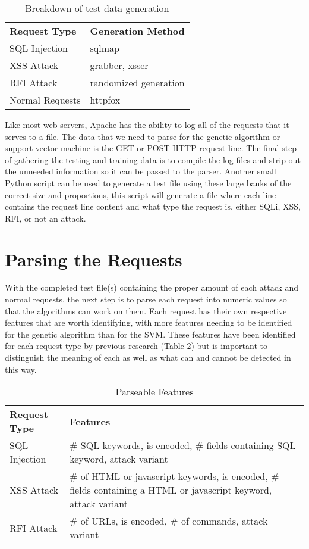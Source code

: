 \begin{table}
	\centering
	\label{tab:tools}
	\begin{tabular}{|l|l|}
	\hline
		\textbf{Request Type} & \textbf{Generation Method}\\
	\hhline{|=|=|}
		SQL Injection & sqlmap\\
	\hline
		XSS Attack & grabber, xsser\\
	\hline
		RFI Attack & randomized generation\\
	\hline
		Normal Requests & httpfox\\
	\hline
	\end{tabular}
	\caption{Breakdown of test data generation}
\end{table}

Like most web-servers, Apache has the ability to log all of the requests that it serves to a file.  The data that we need to parse for the genetic algorithm or support vector machine is the GET or POST HTTP request line.  The final step of gathering the testing and training data is to compile the log files and strip out the unneeded information so it can be passed to the parser.  Another small Python script can be used to generate a test file using these large banks of the correct size and proportions, this script will generate a file where each line contains the request line content and what type the request is, either SQLi, XSS, RFI, or not an attack.

\section{Parsing the Requests}

With the completed test file(s) containing the proper amount of each attack and normal requests, the next step is to parse each request into numeric values so that the algorithms can work on them.  Each request has their own respective features that are worth identifying, with more features needing to be identified for the genetic algorithm than for the SVM.  These features have been identified for each request type by previous research (Table \ref{tab:features}) but is important to distinguish the meaning of each as well as what can and cannot be detected in this way. %

\begin{table}
	\centering
	\label{tab:features}
	\begin{tabular}{|p{1.5in}|p{4.5in}|}
	\hline
		\textbf{Request Type} & \textbf{Features}\\
	\hhline{|=|=|}
		SQL Injection & \# SQL keywords, is encoded, \# fields containing SQL keyword, attack variant\\
	\hline
		XSS Attack & \# of HTML or javascript keywords, is encoded, \# fields containing a HTML or javascript keyword, attack variant\\
	\hline
		RFI Attack & \# of URLs, is encoded, \# of commands, attack variant\\
	\hline
	\end{tabular}
	\caption{Parseable Features}
\end{table}

